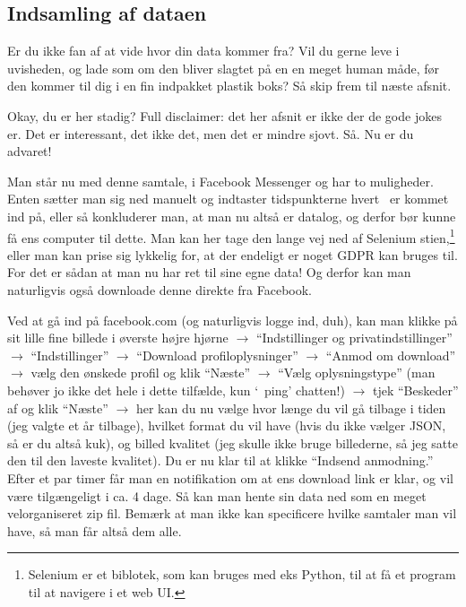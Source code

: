 \begin{article}
\subsection*{Indsamling af dataen}

Er du ikke fan af at vide hvor din data kommer fra? Vil du gerne leve i uvisheden, og lade som om den bliver slagtet på en en meget human måde, før den kommer til dig i en fin indpakket plastik boks? Så skip frem til næste afsnit.

Okay, du er her stadig? Full disclaimer: det her afsnit er ikke der de gode jokes er. Det er interessant, det ikke det, men det er mindre sjovt. Så. Nu er du advaret!

Man står nu med denne samtale, i Facebook Messenger og har to muligheder. Enten sætter man sig ned manuelt og indtaster tidspunkterne hvert \coffee\ er kommet ind på, eller så konkluderer man, at man nu altså er datalog, og derfor bør kunne få ens computer til dette. Man kan her tage den lange vej ned af Selenium stien,\footnote{Selenium er et biblotek, som kan bruges med eks Python, til at få et program til at navigere i et web UI.} eller man kan prise sig lykkelig for, at der endeligt er noget GDPR kan bruges til. For det er sådan at man nu har ret til sine egne data! Og derfor kan man naturligvis også downloade denne direkte fra Facebook.

Ved at gå ind på facebook.com (og naturligvis logge ind, duh), kan man klikke på sit lille fine billede i øverste højre hjørne $\rightarrow$ ``Indstillinger og privatindstillinger'' $\rightarrow$ ``Indstillinger'' $\rightarrow$ ``Download profiloplysninger'' $\rightarrow$ ``Anmod om download'' $\rightarrow$ vælg den ønskede profil og klik ``Næste'' $\rightarrow$ ``Vælg oplysningstype'' (man behøver jo ikke det hele i dette tilfælde, kun `\coffee\ ping' chatten!) $\rightarrow$ tjek ``Beskeder'' af og klik ``Næste'' $\rightarrow$ her kan du nu vælge hvor længe du vil gå tilbage i tiden (jeg valgte et år tilbage), hvilket format du vil have (hvis du ikke vælger JSON, så er du altså kuk), og billed kvalitet (jeg skulle ikke bruge billederne, så jeg satte den til den laveste kvalitet). Du er nu klar til at klikke ``Indsend anmodning.'' Efter et par timer får man en notifikation om at ens download link er klar, og vil være tilgængeligt i ca. 4 dage. Så kan man hente sin data ned som en meget velorganiseret zip fil. Bemærk at man ikke kan specificere hvilke samtaler man vil have, så man får altså dem alle.


\end{article}

